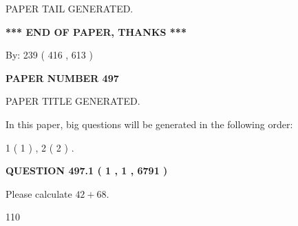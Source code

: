 \documentclass[12pt]{article}
\begin{document}
   
   
\vspace{2.0in} PAPER TAIL GENERATED.
   
   
   
   
\vspace{1.0in} 
{\textbf{\large{ *** END OF PAPER, THANKS *** }}} 
   
   
\hspace{1.0in} By: 
 239 ( 416 ,  613 )
   
   
   
   
\newpage 
\setcounter{page}{ 
   497001 } 
   
   
   
   
 {\textbf{ \Large{ PAPER NUMBER  497  }}}
   
   
\vspace{0.2in}
   
   
   
   
   
   
   
   
 \vspace{0.2in}
 
 
 
 
   
   
 PAPER TITLE GENERATED.
   
   
   
\vspace{0.2in}
   
In this paper, big questions will be generated in the following order: 
   
   
   1 ( 1 )
 ,
   2 ( 2 )
 .
  
\vspace{0.2in}
  
{\textbf{\Large{QUESTION
497.1 
 ( 1 , 1 , 6791 )
}}}
  
  
 
Please calculate $ %
42 +  %
68 $.
 
 
 
\noindent{}
 
 

110
 
 
\noindent{}
 
 

 
 
 
\noindent{}
 
\end{document}
